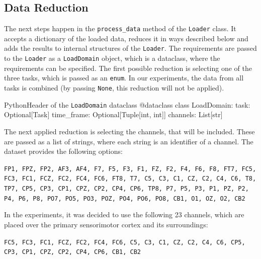 \documentclass[english, he, bc, kiv, iso690alph, viewonly]{fasthesis}
\begin{document}
\subsection{Data Reduction}

The next steps happen in the \texttt{process\_data} method of the \texttt{Loader} class. It accepts a dictionary of the loaded data, reduces it in ways described below and adds the results to internal structures of the \texttt{Loader}. The requirements are passed to the \texttt{Loader} as a \texttt{LoadDomain} object, which is a dataclass, where the requirements can be specified. The first possible reduction is selecting one of the three tasks, which is passed as an \texttt{enum}. In our experiments, the data from all tasks is combined (by passing \texttt{None}, this reduction will not be applied).

\begin{code}{Python}{Header of the \texttt{LoadDomain} dataclass}
	@dataclass
	class LoadDomain:
	task: Optional[Task]
	time_frame: Optional[Tuple[int, int]]
	channels: List[str]
\end{code}

The next applied reduction is selecting the channels, that will be included. These are passed as a list of strings, where each string is an identifier of a channel. The dataset provides the following options:

\texttt{FP1, FPZ, FP2, AF3, AF4, F7, F5, F3, F1, FZ, F2, F4, F6, F8, FT7, FC5, FC3, FC1, FCZ, FC2, FC4, FC6, FT8, T7, C5, C3, C1, CZ, C2, C4, C6, T8, TP7, CP5, CP3, CP1, CPZ, CP2, CP4, CP6, TP8, P7, P5, P3, P1, PZ, P2, P4, P6, P8, PO7, PO5, PO3, POZ, PO4, PO6, PO8, CB1, O1, OZ, O2, CB2}

In the experiments, it was decided to use the following 23 channels, which are placed over the primary sensorimotor cortex and its surroundings:

\texttt{FC5, FC3, FC1, FCZ, FC2, FC4, FC6, C5, C3, C1, CZ, C2, C4, C6, CP5, CP3, CP1, CPZ, CP2, CP4, CP6, CB1, CB2}
\end{document}
